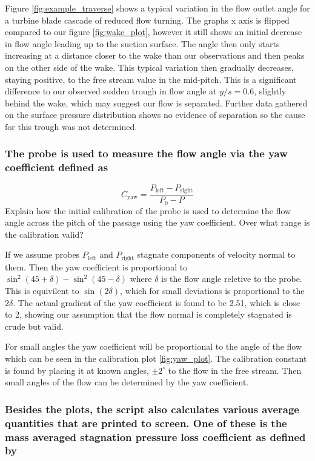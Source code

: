 \documentclass{article}
\begin{document}
Figure \ref{fig:example_traverse} shows a typical variation in the flow outlet angle for a turbine blade cascade of reduced flow turning.
The graphs x axis is flipped compared to our figure \ref{fig:wake_plot}, however it still shows an initial decrease in flow angle leading up to the suction surface.
The angle then only starts increasing at a distance closer to the wake than our observations and then peaks on the other side of the wake.
This typical variation then gradually decreases, staying positive, to the free stream value in the mid-pitch.
This is a significant difference to our observed sudden trough in flow angle at $y/s = 0.6$, slightly behind the wake, which may suggest our flow is separated.
Further data gathered on the surface pressure distribution shows no evidence of separation so the cause for this trough was not determined.

\subsubsection{The probe is used to measure the flow angle via the yaw coefficient defined as
}

\begin{equation}
    C_\text{yaw} = \frac{P_\text{left} - P_\text{right}}{P_0 - P}
\end{equation}
Explain how the initial calibration of the probe is used to determine the flow angle across the
pitch of the passage using the yaw coefficient. Over what range is the calibration valid?

If we assume probes $P_\text{left}$ and $P_\text{right}$ stagnate components of velocity normal to them.
Then the yaw coefficient is proportional to $\sin^2(45 + \delta) - \sin^2(45 - \delta)$ where $\delta$ is the flow angle reletive to the probe.
This is equivilent to $\sin(2\delta)$, which for small deviations is proportional to the $2\delta$.
The actual gradient of the yaw coefficient is found to be 2.51, which is close to 2, showing our assumption that the flow normal is completely stagnated is crude but valid.

For small angles the yaw coefficient will be proportional to the angle of the flow which can be seen in the calibration plot \ref{fig:yaw_plot}.
The calibration constant is found by placing it at known angles, $\pm 2^\circ$ to the flow in the free stream.
Then small angles of the flow can be determined by the yaw coefficient.

\subsubsection{Besides the plots, the script also calculates various average quantities that are printed
to screen. One of these is the mass averaged stagnation pressure loss coefficient as defined by}
\end{document}
